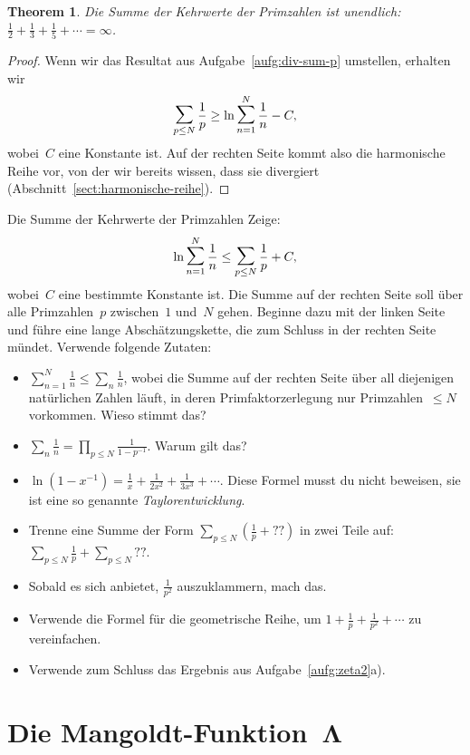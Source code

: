 \documentclass[twoside]{../zirkelblatt1415}
\theoremstyle{definition}
\theoremstyle{plain}
\newtheorem{thm}[defn]{Theorem}
\theoremstyle{remark}
\newcommand{\bigsum}{\mathop{\mathlarger{\mathlarger{\sum}}}}
\begin{document}
\begin{thm}Die Summe der Kehrwerte der Primzahlen ist unendlich:
$\frac{1}{2} + \frac{1}{3} + \frac{1}{5} + \cdots = \infty$.
\end{thm}
\begin{proof}Wenn wir das Resultat aus Aufgabe~\ref{aufg:div-sum-p} umstellen,
erhalten wir
\[ \bigsum_{p \leq N} \frac{1}{p} \geq \ln \bigsum_{n=1}^N \frac{1}{n} - C, \]
wobei~$C$ eine Konstante ist.
Auf der rechten Seite kommt also die harmonische Reihe vor, von der wir bereits
wissen, dass sie divergiert (Abschnitt~\ref{sect:harmonische-reihe}).
\end{proof}

\begin{aufgabe}{Die Summe der Kehrwerte der Primzahlen}\label{aufg:div-sum-p}
Zeige:
\[ \ln \bigsum_{n=1}^N \frac{1}{n} \leq \bigsum_{p \leq N} \frac{1}{p} + C, \]
wobei~$C$ eine bestimmte Konstante ist. Die Summe auf der rechten Seite soll
über alle Primzahlen~$p$ zwischen~$1$ und~$N$ gehen. Beginne dazu mit der
linken Seite und führe eine lange Abschätzungskette, die zum Schluss in der
rechten Seite mündet. Verwende folgende Zutaten:
\begin{itemize}
\item $\sum_{n=1}^N \frac{1}{n} \leq \sum_n \frac{1}{n}$, wobei die Summe auf
der rechten Seite über all diejenigen natürlichen Zahlen läuft, in deren
Primfaktorzerlegung nur Primzahlen~$\leq N$ vorkommen. Wieso stimmt das?
\item $\sum_n \frac{1}{n} = \prod_{p \leq N} \frac{1}{1 - p^{-1}}$. Warum gilt
das?
\item $\ln(1-x^{-1}) = \frac{1}{x} + \frac{1}{2x^2} + \frac{1}{3x^3} + \cdots$.
Diese Formel musst du nicht beweisen, sie ist eine so genannte
\emph{Taylorentwicklung}.
\item Trenne eine Summe der Form $\sum_{p \leq N} (\frac{1}{p} + {??})$ in zwei
Teile auf: $\sum_{p \leq N} \frac{1}{p} + \sum_{p \leq N} {??}$.
\item Sobald es sich anbietet, $\frac{1}{p^2}$ auszuklammern, mach das.
\item Verwende die Formel für die geometrische Reihe, um $1 + \frac{1}{p} +
\frac{1}{p^2} + \cdots$ zu vereinfachen.
\item Verwende zum Schluss das Ergebnis aus Aufgabe~\ref{aufg:zeta2}a).
\end{itemize}\fixlistspacing
\end{aufgabe}


\section{\texorpdfstring{Die Mangoldt-Funktion~$\boldsymbol{\Lambda}$}{Die
Mangoldt-Funktion~Λ}}
\end{document}
